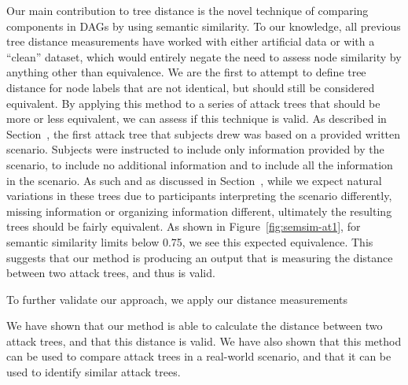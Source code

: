 Our main contribution to tree distance is the novel technique of comparing components in DAGs by using semantic similarity. To our knowledge, all previous tree distance measurements have worked with either artificial data or with a ``clean'' dataset, which would entirely negate the need to assess node similarity by anything other than equivalence. We are the first to attempt to define tree distance for node labels that are not identical, but should still be considered equivalent. By applying this method to a series of attack trees that should be more or less equivalent, we can assess if this technique is valid. As described in Section~, the first attack tree that subjects drew was based on a provided written scenario. Subjects were instructed to include only information provided by the scenario, to include no additional information and to include all the information in the scenario. As such and as discussed in Section~, while we expect natural variations in these trees due to participants interpreting the scenario differently, missing information or organizing information different, ultimately the resulting trees should be fairly equivalent. As shown in Figure~\ref{fig:semsim-at1}, for semantic similarity limits  below 0.75, we see this expected equivalence. This suggests that our method is producing an output that is measuring the distance between two attack trees, and thus is valid.

To further validate our approach, we apply our distance measurements


We have shown that our method is able to calculate the distance between two attack trees, and that this distance is valid. We have also shown that this method can be used to compare attack trees in a real-world scenario, and that it can be used to identify similar attack trees.


